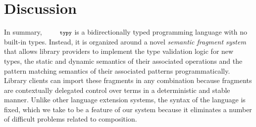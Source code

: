 \documentclass[10pt]{sigplanconf}
\newcommand{\typy}{\texttt{\footnotesize typy}}
\newcommand{\myrowcolour}{\rowcolor[gray]{0.925}}
\begin{document}
%
%
%
%
%
%
%

\section{Discussion}\label{sec:discussion}
In summary, $\typy$ is a bidirectionally typed programming language with no built-in types. Instead, it is organized around a novel \emph{semantic fragment system} that allows library providers to implement the type validation logic for new types, the static and dynamic semantics of their associated operations and the pattern matching semantics of their associated patterns programmatically. Library clients can import these fragments in any combination because fragments are contextually delegated control over terms in a deterministic and stable manner. Unlike other language extension systems, the syntax of the language is fixed, which we take to be a feature of our system because it eliminates a number of difficult problems related to composition. 
\end{document}
